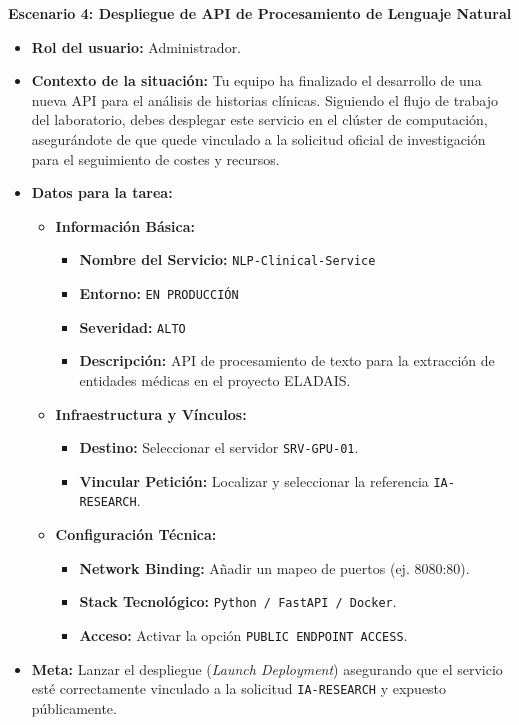 \noindent\textbf{Escenario 4: Despliegue de API de Procesamiento de Lenguaje Natural}
\begin{itemize}
  \item \textbf{Rol del usuario:} Administrador.
    \item \textbf{Contexto de la situación:} 
    Tu equipo ha finalizado el desarrollo de una nueva API para el análisis de historias clínicas. Siguiendo el flujo de trabajo del laboratorio, debes desplegar este servicio en el clúster de computación, asegurándote de que quede vinculado a la solicitud oficial de investigación para el seguimiento de costes y recursos.
    
    \item \textbf{Datos para la tarea:}
        \begin{itemize}
            \item \textbf{Información Básica:} 
                \begin{itemize}
                    \item \textbf{Nombre del Servicio:} \texttt{NLP-Clinical-Service}
                    \item \textbf{Entorno:} \texttt{EN PRODUCCIÓN}
                    \item \textbf{Severidad:} \texttt{ALTO}
                    \item \textbf{Descripción:} API de procesamiento de texto para la extracción de entidades médicas en el proyecto ELADAIS.
                \end{itemize}
            \item \textbf{Infraestructura y Vínculos:}
                \begin{itemize}
                    \item \textbf{Destino:} Seleccionar el servidor \texttt{SRV-GPU-01}.
                    \item \textbf{Vincular Petición:} Localizar y seleccionar la referencia \texttt{IA-RESEARCH}.
                \end{itemize}
            \item \textbf{Configuración Técnica:}
                \begin{itemize}
                    \item \textbf{Network Binding:} Añadir un mapeo de puertos (ej. 8080:80).
                    \item \textbf{Stack Tecnológico:} \texttt{Python / FastAPI / Docker}.
                    \item \textbf{Acceso:} Activar la opción \texttt{PUBLIC ENDPOINT ACCESS}.
                \end{itemize}
        \end{itemize}
    \item \textbf{Meta:} 
    Lanzar el despliegue (\textit{Launch Deployment}) asegurando que el servicio esté correctamente vinculado a la solicitud \texttt{IA-RESEARCH} y expuesto públicamente.
\end{itemize}

